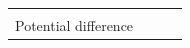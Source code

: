 \begin{enumerate}[noitemsep, label=\textbf{\arabic*}. ]
{\begin{tabular}[t]{|l|l|l|l|}
    
         &
    
    
     \tabularnewline\cline{1-1}\cline{2-2}\cline{3-3}\cline{4-4}
    
    
        Potential difference &
    
    
         &
    
    
         &
    
    
     \tabularnewline\cline{1-1}\cline{2-2}\cline{3-3}\cline{4-4}
    \end{tabular}} %
      \addtocounter{footnote}{-0}
      
    
\end{enumerate}
